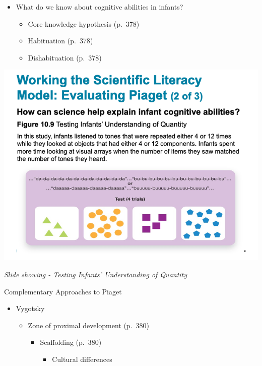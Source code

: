 \documentclass[
]{book}
\providecommand{\tightlist}{%
  \setlength{\itemsep}{0pt}\setlength{\parskip}{0pt}}
\begin{document}
\begin{itemize}
\tightlist
\item
  What do we know about cognitive abilities in infants?

  \begin{itemize}
  \tightlist
  \item
    Core knowledge hypothesis (p.~378)
  \item
    Habituation (p.~378)
  \item
    Dishabituation (p.~378)
  \end{itemize}
\end{itemize}

\includegraphics{assets/unit_3/slide_31.png}

\emph{Slide showing - Testing Infants' Understanding of Quantity}

Complementary Approaches to Piaget

\begin{itemize}
\tightlist
\item
  Vygotsky

  \begin{itemize}
  \tightlist
  \item
    Zone of proximal development (p.~380)

    \begin{itemize}
    \tightlist
    \item
      Scaffolding (p.~380)

      \begin{itemize}
      \tightlist
      \item
        Cultural differences
      \end{itemize}
    \end{itemize}
  \end{itemize}
\end{itemize}
\end{document}
